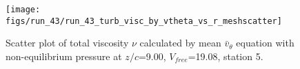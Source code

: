 \begin{figure}[H]
\centering
\texttt{[image: figs/run\_43/run\_43\_turb\_visc\_by\_vtheta\_vs\_r\_meshscatter]}
\caption{Scatter plot of total viscosity $\nu$ calculated by mean $\bar{v}_{\theta}$ equation with non-equilibrium pressure at $z/c$=9.00, $V_{free}$=19.08, station 5.}
\label{fig:run_43_turb_visc_by_vtheta_vs_r_meshscatter}
\end{figure}


